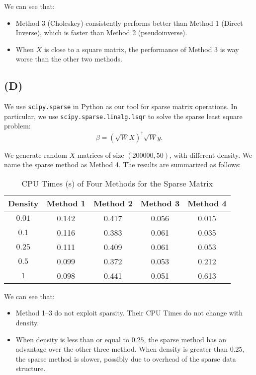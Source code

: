 \documentclass[a4paper,11pt]{article}
\begin{document}
We can see that:
\begin{itemize}
	\item Method 3 (Choleskey) consistently performs better than Method 1 (Direct Inverse), which is faster than Method 2 (pseudoinverse). 
	\item When $X$ is close to a square matrix, the performance of Method 3 is way worse than the other two methods.
\end{itemize} 

\subsection{(D)}

We use \texttt{scipy.sparse} in Python as our tool for sparse matrix operations. In particular, we use \texttt{scipy.sparse.linalg.lsqr} to solve the sparse least square problem:
$$
\beta  = (\sqrt{W}X)^\dagger \sqrt{W} y.
$$

We generate random $X$ matrices of size $(200000,50)$, with different density. We name the sparse method as Method 4. The results are summarized as follows:

\begin{table}[!h]
\caption{CPU Times (s) of Four Methods for the Sparse Matrix}
\centering
\begin{tabular}{c c c c c }
\firsthline
Density&  Method 1 & Method 2 &Method 3 & Method 4  \\
\hline
$0.01$& 0.142& 0.417 & 0.056 &0.015  \\
$0.1$ & 0.116& 0.383 & 0.061 &0.035\\
$0.25$ & 0.111 & 0.409 & 0.061 & 0.053 \\
$0.5$ & 0.099& 0.372 & 0.053 &0.212 \\
$1$ &  0.098 & 0.441 & 0.051& 0.613\\
\hline
\end{tabular}
\end{table}

We can see that:
\begin{itemize}
	\item Method 1--3 do not exploit sparsity. Their CPU Times do not change with density.
	\item When density is less than or equal to $0.25$, the sparse method has an advantage over the other three method. When density is greater than $0.25$, the sparse method is slower, possibly due to overhead of the sparse data structure.
\end{itemize} 








%
%
\end{document}
